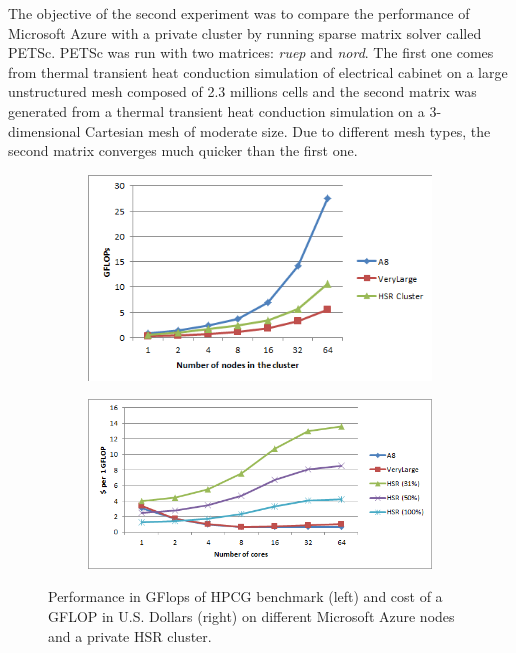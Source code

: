 \documentclass[3p,times]{elsarticle}
\begin{document}
The objective of the second experiment was to compare the performance of Microsoft Azure with a private cluster by running sparse matrix solver called PETSc. PETSc was run with two matrices: \textit{ruep} and \textit{nord}. The first one comes from thermal transient heat conduction simulation of electrical cabinet on a large unstructured mesh composed of 2.3 millions cells and the second matrix was generated from a thermal transient heat conduction simulation on a 3-dimensional Cartesian mesh of moderate size. Due to different mesh types, the second matrix converges much quicker than the first one. 



\begin{figure}
\centering
\begin{subfigure}{.5\textwidth}
  \centering
			\includegraphics[width=\linewidth]{hpcg}	
  \label{fig:hpcg}
\end{subfigure}%
\begin{subfigure}{.5\textwidth}
  \centering
  \includegraphics[width=\linewidth]{cost}
  \label{fig:cost}
\end{subfigure}
\caption{Performance in GFlops of HPCG benchmark (left) and cost of a GFLOP in U.S. Dollars (right) on different Microsoft Azure nodes and a private HSR cluster. }
\end{figure}
\end{document}
